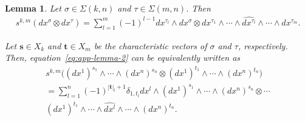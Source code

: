 \documentclass[final]{amsart}%
\newtheorem{lemma}{Lemma}
\newcommand{\charset}{X}
\newcommand{\0}{\mathaccent23}
\begin{document}
\begin{lemma}\label{lem:s}
Let $\sigma\in\Sigma(k,n)$ and $\tau\in\Sigma(m,n)$. Then
\begin{gather}
    \label{eq:app-lemma-2}
    s^{k,m} \left(dx^\sigma\otimes dx^\tau\right)
    = \sum_{l=1}^m (-1)^{l-1} dx^{\tau_l} \wedge dx^\sigma
    \otimes dx^{\tau_1}\wedge \cdots \wedge \widehat{dx^{\tau_l}}\wedge\cdots\wedge dx^{\tau_m}.
\end{gather}

Let $\bm s\in \charset_k$ and $\bm t\in\charset_m$ be the characteristic vectors of $\sigma$ and $\tau$, respectively. Then, equation~\eqref{eq:app-lemma-2} can be equivalently written as
\begin{multline}
    \label{eq:app-lemma-1}
    s^{k, m}\bigl((dx^{1})^{s_1}\wedge\cdots \wedge (dx^{n})^{s_n}\otimes (dx^{1})^{t_1}\wedge \cdots \wedge (dx^{n})^{t_n}\bigr)\\
    =
    \sum_{l=1}^{n}(-1)^{|\bm{t}|_{l}+1}\delta_{1,t_l}dx^{l}\wedge (dx^1)^{s_1}\wedge\cdots \wedge (dx^n)^{s_n}\otimes \cdots\\
    (dx^1)^{t_1}\wedge \cdots \wedge \widehat{dx^l}\wedge\cdots\wedge (dx^n)^{t_n}.
\end{multline}
\end{lemma}
\end{document}
